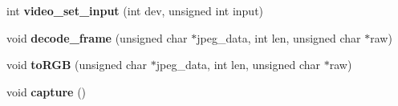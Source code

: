 \begin{DoxyCompactItemize}
\item 
\hypertarget{classUVCVideo_ad8d87f76d3dabe05a65f59f8526149d3}{int {\bfseries video\-\_\-set\-\_\-input} (int dev, unsigned int input)}\label{classUVCVideo_ad8d87f76d3dabe05a65f59f8526149d3}

\item 
\hypertarget{classUVCVideo_a332595f8be17a2dc4f8ee34e94152404}{void {\bfseries decode\-\_\-frame} (unsigned char $\ast$jpeg\-\_\-data, int len, unsigned char $\ast$raw)}\label{classUVCVideo_a332595f8be17a2dc4f8ee34e94152404}

\item 
\hypertarget{classUVCVideo_a992489d2af10fa90dda805155ecfabba}{void {\bfseries to\-R\-G\-B} (unsigned char $\ast$jpeg\-\_\-data, int len, unsigned char $\ast$raw)}\label{classUVCVideo_a992489d2af10fa90dda805155ecfabba}

\item 
\hypertarget{classUVCVideo_a19691cd99fd2d9f0716692e72eb1b0ab}{void {\bfseries capture} ()}\label{classUVCVideo_a19691cd99fd2d9f0716692e72eb1b0ab}

\end{DoxyCompactItemize}
